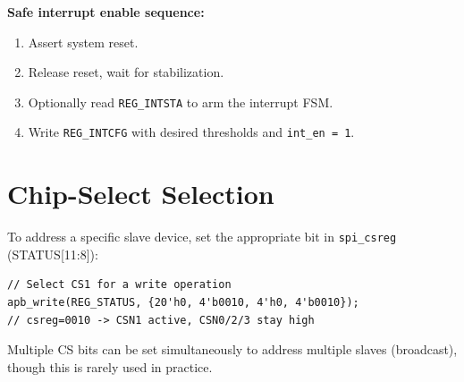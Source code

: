 \textbf{Safe interrupt enable sequence:}
\begin{enumerate}[leftmargin=2em]
  \item Assert system reset.
  \item Release reset, wait for stabilization.
  \item Optionally read \texttt{REG\_INTSTA} to arm the interrupt FSM.
  \item Write \texttt{REG\_INTCFG} with desired thresholds and \texttt{int\_en = 1}.
\end{enumerate}

\section{Chip-Select Selection}

To address a specific slave device, set the appropriate bit in \texttt{spi\_csreg} (STATUS[11:8]):
\begin{lstlisting}
// Select CS1 for a write operation
apb_write(REG_STATUS, {20'h0, 4'b0010, 4'h0, 4'b0010});
// csreg=0010 -> CSN1 active, CSN0/2/3 stay high
\end{lstlisting}

Multiple CS bits can be set simultaneously to address multiple slaves (broadcast), though this
is rarely used in practice.

